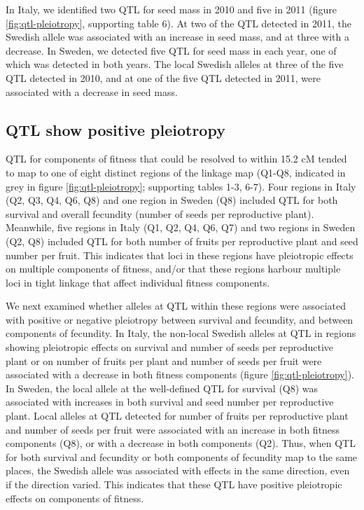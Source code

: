 \documentclass[12pt,]{article}
\begin{document}
In Italy, we identified two QTL for seed mass in 2010 and five in 2011 (figure \ref{fig:qtl-pleiotropy}, supporting table 6).
At two of the QTL detected in 2011, the Swedish allele was associated with an increase in seed mass, and at three with a decrease. In Sweden, we detected five QTL for seed mass in each year, one of which was detected in both years. The local Swedish alleles at three of the five QTL detected in 2010, and at one of the five QTL detected in 2011, were associated with a decrease in seed mass.

\hypertarget{qtl-show-positive-pleiotropy}{%
\subsection{QTL show positive pleiotropy}\label{qtl-show-positive-pleiotropy}}

QTL for components of fitness that could be resolved to within 15.2 cM tended to map to one of eight distinct regions of the linkage map (Q1-Q8, indicated in grey in figure \ref{fig:qtl-pleiotropy}; supporting tables 1-3, 6-7).
Four regions in Italy (Q2, Q3, Q4, Q6, Q8) and one region in Sweden (Q8) included QTL for both survival and overall fecundity (number of seeds per reproductive plant).
Meanwhile, five regions in Italy (Q1, Q2, Q4, Q6, Q7) and two regions in Sweden (Q2, Q8) included QTL for both number of fruits per reproductive plant and seed number per fruit.
This indicates that loci in these regions have pleiotropic effects on multiple components of fitness, and/or that these regions harbour multiple loci in tight linkage that affect individual fitness components.

We next examined whether alleles at QTL within these regions were associated with positive or negative pleiotropy between survival and fecundity, and between components of fecundity.
In Italy, the non-local Swedish alleles at QTL in regions showing pleiotropic effects on survival and number of seeds per reproductive plant or on number of fruits per plant and number of seeds per fruit were associated with a decrease in both fitness components (figure \ref{fig:qtl-pleiotropy}).
In Sweden, the local allele at the well-defined QTL for survival (Q8) was associated with increases in both survival and seed number per reproductive plant.
Local alleles at QTL detected for number of fruits per reproductive plant and number of seeds per fruit were associated with an increase in both fitness components (Q8), or with a decrease in both components (Q2).
Thus, when QTL for both survival and fecundity or both components of fecundity map to the same places, the Swedish allele was associated with effects in the same direction, even if the direction varied.
This indicates that these QTL have positive pleiotropic effects on components of fitness.
\end{document}
